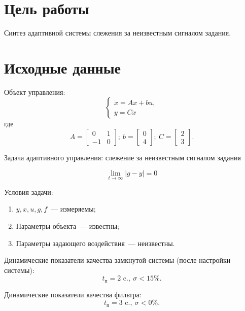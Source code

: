 \section{Цель работы}
Синтез адаптивной системы слежения за неизвестным сигналом задания.

\section{Исходные данные}
Объект управления:
\begin{equation}
	\begin{cases}\label{co}
		\dot{x} = A x + b u,\\
		y = C x
	\end{cases}
\end{equation}
где 
\begin{equation*}
	A = 
	\begin{bmatrix}
		0 & 1\\ -1 & 0
	\end{bmatrix};~
	b = 
	\begin{bmatrix}
		0\\ 4
	\end{bmatrix};~
	C = 
	\begin{bmatrix}
		2\\ 3
	\end{bmatrix}.
\end{equation*}

Задача адаптивного управления: слежение за неизвестным сигналом задания

\begin{equation}\label{goal}
\lim_{t \to \infty} |g - y| = 0
\end{equation}

Условия задачи:
\begin{enumerate}[1.]
	\item $y, x, u, g, f$~--- измеряемы;
	\item Параметры объекта~--- известны;
	\item Параметры задающего воздействия~--- неизвестны.
\end{enumerate}

Динамические показатели качества замкнутой системы (после настройки системы): 
\begin{equation}\label{quality}
	t_\text{п} = 2 \text{ c.},~
	\sigma < 15\%.	
\end{equation}

Динамические показатели качества фильтра:
\begin{equation}\label{filter_quality}
	t_\text{п} = 3 \text{ c.},~
	\sigma < 0\%.	
\end{equation}

